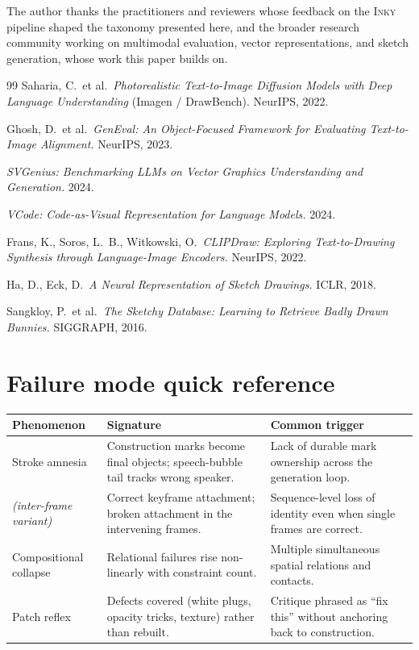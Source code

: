 \documentclass[10pt,twocolumn]{article}
\newcommand{\inky}{\textsc{Inky}}
\begin{document}
The author thanks the practitioners and reviewers whose feedback on
the \inky{} pipeline shaped the taxonomy presented here, and the
broader research community working on multimodal evaluation, vector
representations, and sketch generation, whose work this paper builds
on.

\begin{thebibliography}{99}
\small
{}
  Saharia, C.\ et al.\ \emph{Photorealistic Text-to-Image Diffusion
  Models with Deep Language Understanding} (Imagen / DrawBench).
  NeurIPS, 2022.

  Ghosh, D.\ et al.\ \emph{GenEval: An Object-Focused Framework for
  Evaluating Text-to-Image Alignment.} NeurIPS, 2023.

  \emph{SVGenius: Benchmarking LLMs on Vector Graphics
  Understanding and Generation.} 2024.

  \emph{VCode: Code-as-Visual Representation for Language Models.}
  2024.

  Frans, K., Soros, L.\ B., Witkowski, O.\ \emph{CLIPDraw:
  Exploring Text-to-Drawing Synthesis through Language-Image
  Encoders.} NeurIPS, 2022.

  Ha, D., Eck, D.\ \emph{A Neural Representation of Sketch
  Drawings.} ICLR, 2018.

  Sangkloy, P.\ et al.\ \emph{The Sketchy Database: Learning to
  Retrieve Badly Drawn Bunnies.} SIGGRAPH, 2016.

\end{thebibliography}

\onecolumn
\appendix

\section{Failure mode quick reference}
\label{app:quickref}

\begin{table}[h!]
  \small
  \centering
  \begin{tabular}{@{}p{3cm}p{5cm}p{6cm}@{}}
    \toprule
    \textbf{Phenomenon} & \textbf{Signature} & \textbf{Common trigger} \\
    \midrule
    Stroke amnesia & Construction marks become final objects; speech-bubble tail tracks wrong speaker. & Lack of durable mark ownership across the generation loop. \\
    \quad\textit{(inter-frame variant)} & Correct keyframe attachment; broken attachment in the intervening frames. & Sequence-level loss of identity even when single frames are correct. \\
    Compositional collapse & Relational failures rise non-linearly with constraint count. & Multiple simultaneous spatial relations and contacts. \\
    Patch reflex & Defects covered (white plugs, opacity tricks, texture) rather than rebuilt. & Critique phrased as ``fix this'' without anchoring back to construction. \\
    \bottomrule
  \end{tabular}
\end{table}
\end{document}
